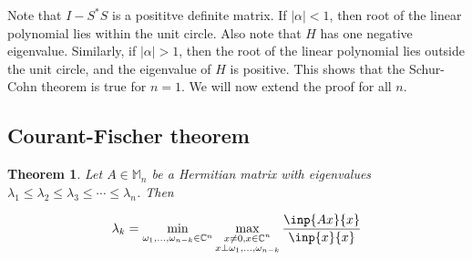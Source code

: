 \documentclass[twofold]{article}
\newcommand*\adj[1]{#1^*}
\newcommand*\abs[1]{\left \vert #1 \right\vert}
\theoremstyle{plain}
\newtheorem{theorem}{Theorem}
\theoremstyle{definition}
\theoremstyle{remark}
\begin{document}
Note that \(I - \adj{S} S\) is a posititve definite matrix. If \(\abs{\alpha} < 1\), then root of the linear polynomial lies within the unit circle. Also note that \(H\) has one negative eigenvalue. Similarly, if \(\abs{\alpha} > 1\), then the root of the linear polynomial lies outside the unit circle, and the eigenvalue of \(H\) is positive. This shows that the Schur-Cohn theorem is true for \(n = 1\). We will now extend the proof for all \(n\). 


\subsection{Courant-Fischer theorem}

\begin{theorem} Let \(A \in \mathbb{M}_n\) be a Hermitian matrix with eigenvalues \(\lambda_1 \le \lambda_2 \le \lambda_3 \le \cdots \le \lambda_n\). Then 

  \[ \lambda_k = \min_{\omega_1, \ldots , \omega_{n-k} \in \mathbb{C}^n} \max_{\substack{x \neq 0, x\in \mathbb{C}^n \\ x \perp \omega_1, \ldots , \omega_{n-k}}} \frac{\inp{Ax}{x}}{\inp{x}{x}}\]

 \end{theorem}
\end{document}
